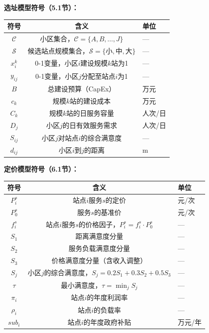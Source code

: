 \documentclass[zihao=-4]{cumcmthesis}
\begin{document}
\textbf{选址模型符号（5.1节）：}

\begin{center}
\begin{tabular}{ccl}
\toprule
符号 & 含义 & 单位 \\
\midrule
$\mathcal{C}$ & 小区集合，$\mathcal{C}=\{A,B,\ldots,J\}$ & — \\
$\mathcal{S}$ & 候选站点规模集合，$\mathcal{S}=\{\text{小},\text{中},\text{大}\}$ & — \\
$x_{i}^{k}$ & 0-1变量，小区$i$建设规模$k$站为1 & — \\
$y_{ij}$ & 0-1变量，小区$j$分配至站点$i$为1 & — \\
$B$ & 总建设预算（CapEx） & 万元 \\
$c_k$ & 规模$k$站的建设成本 & 万元 \\
$C_k$ & 规模$k$站的日服务容量 & 人次/日 \\
$D_j$ & 小区$j$的日有效服务需求 & 人次/日 \\
$S_{ij}$ & 小区$j$对站点$i$的综合满意度 & — \\
$d_{ij}$ & 小区$i$到$j$的距离 & m \\
\bottomrule
\end{tabular}
\end{center}

\textbf{定价模型符号（6.1节）：}

\begin{center}
\begin{tabular}{ccl}
\toprule
符号 & 含义 & 单位 \\
\midrule
$P_i^s$ & 站点$i$服务$s$的定价 & 元/次 \\
$P_0^s$ & 服务$s$的基准价 & 元/次 \\
$f_i^s$ & 站点$i$服务$s$的价格因子，$P_i^s = f_i^s \cdot P_0^s$ & — \\
$S_1$ & 距离满意度分量 & — \\
$S_2$ & 服务负载满意度分量 & — \\
$S_3$ & 价格满意度分量（含收入调整） & — \\
$S_j$ & 小区$j$的综合满意度，$S_j = 0.2S_1 + 0.3S_2 + 0.5S_3$ & — \\
$\tau$ & 最小满意度，$\tau = \min_j S_j$ & — \\
$\pi_i$ & 站点$i$的年度利润率 & — \\
$\rho_i$ & 站点$i$的负载率 & — \\
$sub_i$ & 站点$i$的年度政府补贴 & 万元/年 \\
\bottomrule
\end{tabular}
\end{center}
\end{document}
